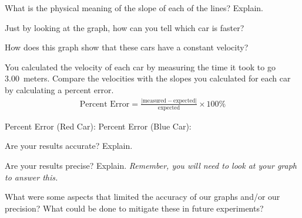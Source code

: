 \documentclass[10pt]{exam}
\begin{document}
\begin{questions}

  \question
    What is the physical meaning of the slope of each of the lines?  Explain.
    \vs

  \question
    Just by looking at the graph, how can you tell which car is faster?
    \vs
    
  \question
    How does this graph show that these cars have a constant velocity?
    \vs

  \pagebreak

  \question
    You calculated the velocity of each car by measuring the time it took to go 3.00~meters.  Compare the velocities with the slopes you calculated for each car by calculating a percent error.
    \begin{align*}
      \text{Percent Error} = \frac{\left| \text{measured} - \text{expected}  \right|}{\text{expected}} \times 100\%
    \end{align*}

    \vs

    Percent Error (Red Car): \fillin[][10em]
    \hfill
    Percent Error (Blue Car): \fillin[][10em]
  
  \question
    Are your results accurate?  Explain.
    \vs
  
  \question
    Are your results precise?  Explain.  \emph{Remember, you will need to look at your graph to answer this.}
    \vs

  \question
    What were some aspects that limited the accuracy of our graphs and/or our precision?  What could be done to mitigate these in future experiments?
    \vs
  
  


\end{questions}
\end{document}

